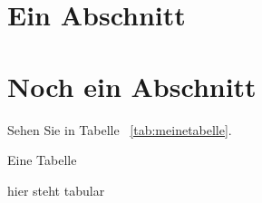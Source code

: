 \documentclass[a6paper]{scrartcl}
\begin{document}
\section{Ein Abschnitt}
\label{sec:ein-abschnitt}

\section{Noch ein Abschnitt}
\label{sec:ein-abschnitt}

Sehen Sie in Tabelle~%
\ref{tab:meinetabelle}.

\begin{table}[htbp]
  \centering
  \label{tab:meinetabelle}
  \caption{Eine Tabelle}
  hier steht tabular
\end{table}
\end{document}
